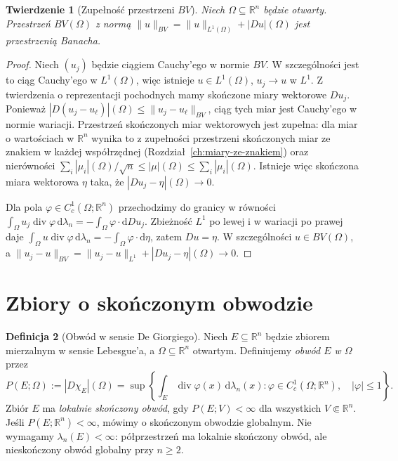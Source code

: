 \documentclass[11pt,a4paper,oneside]{book}
\numberwithin{equation}{chapter}
\theoremstyle{plain}
\newtheorem{twierdzenie}{Twierdzenie}[chapter]
\theoremstyle{definition}
\newtheorem{definicja}[twierdzenie]{Definicja}
\theoremstyle{remark}
\begin{document}
\begin{twierdzenie}[Zupełność przestrzeni $BV$]
\label{thm:BV-banach-29}
Niech $\Omega\subseteq\mathbb R^n$ będzie otwarty.
Przestrzeń $BV(\Omega)$ z normą
$\|u\|_{BV}=\|u\|_{L^1(\Omega)}+|Du|(\Omega)$
jest przestrzenią Banacha.
\end{twierdzenie}
\begin{proof}
Niech $(u_j)$ będzie ciągiem Cauchy'ego w normie
$BV$. W szczególności jest to ciąg Cauchy'ego w
$L^1(\Omega)$, więc istnieje $u\in L^1(\Omega)$,
$u_j\to u$ w $L^1$. Z twierdzenia o reprezentacji
pochodnych mamy skończone miary wektorowe $Du_j$.
Ponieważ
$|D(u_j-u_\ell)|(\Omega)\le\|u_j-u_\ell\|_{BV}$,
ciąg tych miar jest Cauchy'ego w normie wariacji.
Przestrzeń skończonych miar wektorowych jest zupełna:
dla miar o wartościach w $\mathbb R^n$ wynika to z
zupełności przestrzeni skończonych miar ze znakiem
w każdej współrzędnej (Rozdział~\ref{ch:miary-ze-znakiem})
oraz nierówności
$\sum_i|\mu_i|(\Omega)/\sqrt n\le|\mu|(\Omega)
\le\sum_i|\mu_i|(\Omega)$.
Istnieje więc skończona miara wektorowa $\eta$
taka, że $|Du_j-\eta|(\Omega)\to0$.

Dla pola $\varphi\in C_c^1(\Omega;\mathbb R^n)$
przechodzimy do granicy w równości
$\int_\Omega u_j\operatorname{div}\varphi\,\mathrm d\lambda_n
=-\int_\Omega\varphi\cdot\mathrm dDu_j$.
Zbieżność $L^1$ po lewej i w wariacji po prawej daje
$\int_\Omega u\operatorname{div}\varphi\,\mathrm d\lambda_n
=-\int_\Omega\varphi\cdot\mathrm d\eta$, zatem $Du=\eta$.
W szczególności $u\in BV(\Omega)$, a
$\|u_j-u\|_{BV}=\|u_j-u\|_{L^1}+|Du_j-\eta|(\Omega)\to0$.
\end{proof}

\section{Zbiory o skończonym obwodzie}
\begin{definicja}[Obwód w sensie De Giorgiego]
\label{def:finite-perimeter-29}
Niech $E\subseteq\mathbb R^n$ będzie zbiorem mierzalnym
w sensie Lebesgue'a, a $\Omega\subseteq\mathbb R^n$ otwartym.
Definiujemy \emph{obwód $E$ w $\Omega$} przez
\[
 P(E;\Omega):=|D\chi_E|(\Omega)
 =\sup\left\{\int_E\operatorname{div}\varphi(x)
 \,\mathrm d\lambda_n(x):
 \varphi\in C_c^1(\Omega;\mathbb R^n),\quad|\varphi|\le1
 \right\}.
\]
Zbiór $E$ ma \emph{lokalnie skończony obwód},
gdy $P(E;V)<\infty$ dla wszystkich $V\Subset\mathbb R^n$.
Jeśli $P(E;\mathbb R^n)<\infty$, mówimy o skończonym
obwodzie globalnym. Nie wymagamy $\lambda_n(E)<\infty$:
półprzestrzeń ma lokalnie skończony obwód, ale
nieskończony obwód globalny przy $n\ge2$.
\end{definicja}
\end{document}
